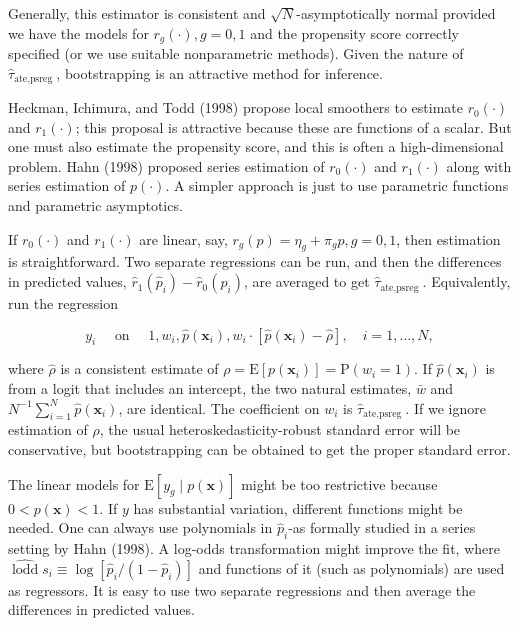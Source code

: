 \documentclass[10pt]{article}
\begin{document}
Generally, this estimator is consistent and $\sqrt{N}$-asymptotically normal provided we have the models for $r_{g}(\cdot), g=0,1$ and the propensity score correctly specified (or we use suitable nonparametric methods). Given the nature of $\hat{\tau}_{\text {ate,psreg }}$, bootstrapping is an attractive method for inference.

Heckman, Ichimura, and Todd (1998) propose local smoothers to estimate $r_{0}(\cdot)$ and $r_{1}(\cdot)$; this proposal is attractive because these are functions of a scalar. But one must also estimate the propensity score, and this is often a high-dimensional problem. Hahn (1998) proposed series estimation of $r_{0}(\cdot)$ and $r_{1}(\cdot)$ along with series estimation of $p(\cdot)$. A simpler approach is just to use parametric functions and parametric asymptotics.

If $r_{0}(\cdot)$ and $r_{1}(\cdot)$ are linear, say, $r_{g}(p)=\eta_{g}+\pi_{g} p, g=0,1$, then estimation is straightforward. Two separate regressions can be run, and then the differences in predicted values, $\hat{r}_{1}\left(\hat{p}_{i}\right)-\hat{r}_{0}\left(\hat{p}_{i}\right)$, are averaged to get $\hat{\tau}_{\text {ate,psreg }}$. Equivalently, run the regression


\begin{equation*}
y_{i} \quad \text { on } \quad 1, w_{i}, \hat{p}\left(\mathbf{x}_{i}\right), w_{i} \cdot\left[\hat{p}\left(\mathbf{x}_{i}\right)-\hat{\rho}\right], \quad i=1, \ldots, N, \tag{21.52}
\end{equation*}


where $\hat{\rho}$ is a consistent estimate of $\rho=\mathrm{E}\left[p\left(\mathbf{x}_{i}\right)\right]=\mathrm{P}\left(w_{i}=1\right)$. If $\hat{p}\left(\mathbf{x}_{i}\right)$ is from a logit that includes an intercept, the two natural estimates, $\bar{w}$ and $N^{-1} \sum_{i=1}^{N} \hat{p}\left(\mathbf{x}_{i}\right)$, are identical. The coefficient on $w_{i}$ is $\hat{\tau}_{\text {ate,psreg }}$. If we ignore estimation of $\rho$, the usual heteroskedasticity-robust standard error will be conservative, but bootstrapping can be obtained to get the proper standard error.

The linear models for $\mathrm{E}\left[y_{g} \mid p(\mathbf{x})\right]$ might be too restrictive because $0<p(\mathbf{x})<1$. If $y$ has substantial variation, different functions might be needed. One can always use polynomials in $\hat{p}_{i}$-as formally studied in a series setting by Hahn (1998). A log-odds transformation might improve the fit, where $\widehat{\operatorname{lodd}} s_{i} \equiv \log \left[\hat{p}_{i} /\left(1-\hat{p}_{i}\right)\right]$ and functions of it (such as polynomials) are used as regressors. It is easy to use two separate regressions and then average the differences in predicted values.
\end{document}
